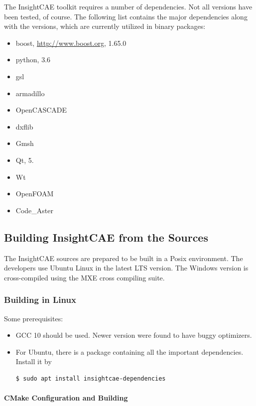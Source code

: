 The InsightCAE toolkit requires a number of dependencies. 
Not all versions have been tested, of course. 
The following list contains the major dependencies along with the versions, which are currently utilized in binary packages:
\begin{itemize}
\item boost, \url{http://www.boost.org}, 1.65.0
\item python, 3.6
\item gsl
\item armadillo
\item OpenCASCADE
\item dxflib
\item Gmsh
\item Qt, 5.
\item Wt
\item OpenFOAM
\item Code\_Aster
\end{itemize}

\subsection{Building InsightCAE from the Sources}

The InsightCAE sources are prepared to be built in a Posix environment.
The developers use Ubuntu Linux in the latest LTS version.
The Windows version is cross-compiled using the MXE cross compiling suite.

\subsubsection{Building in Linux}

Some prerequisites:
\begin{itemize}
\item GCC 10 should be used. Newer version were found to have buggy optimizers. \warningsymbol
\item For Ubuntu, there is a package containing all the important dependencies. 
Install it by
\begin{lstlisting}[language=bash]
$ sudo apt install insightcae-dependencies
\end{lstlisting}
\end{itemize}

\paragraph{CMake Configuration and Building}

